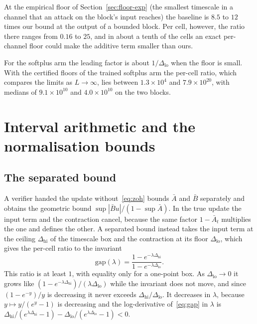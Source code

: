 \documentclass[11pt, a4paper]{article}
\theoremstyle{remark}
\theoremstyle{plain}
\newcommand{\Abar}{\bar{A}}
\newcommand{\Bbar}{\bar{B}}
\begin{document}
At the empirical floor of Section~\ref{sec:floor-exp} (the smallest timescale in a channel that an
attack on the block's input reaches) the baseline is $8.5$ to $12$ times our bound at the output of
a bounded block. Per cell, however, the ratio there ranges from $0.16$ to $25$, and in about a
tenth of the cells an exact per-channel floor could make the additive term smaller than ours.

For the softplus arm the leading factor is about $1/\Delta_{\mathrm{lo}}$ when the floor is small.
With the certified floors of the trained softplus arm the per-cell ratio, which compares the limits
as $L \to \infty$, lies between $1.3 \times 10^{4}$ and $7.9 \times 10^{20}$, with medians of $9.1
\times 10^{10}$ and $4.0 \times 10^{10}$ on the two blocks.

\section{Interval arithmetic and the normalisation bounds}
\label{app:separate}

\subsection{The separated bound}

A verifier handed the update without~\eqref{eq:zoh} bounds $\Abar$ and $\Bbar$ separately and
obtains the geometric bound $\sup|\Bbar u|/(1 - \sup\Abar)$. In the true update the input term
and the contraction cancel, because the same factor $1 - \Abar_t$ multiplies the one and defines
the other. A
separated bound instead takes the input term at the ceiling $\Delta_{\mathrm{hi}}$ of the
timescale box and the contraction at its floor $\Delta_{\mathrm{lo}}$, which gives the per-cell
ratio to the invariant
\begin{equation}
\label{eq:gap}
  \mathrm{gap}(\lambda)
    = \frac{1 - e^{-\lambda \Delta_{\mathrm{hi}}}}{1 - e^{-\lambda \Delta_{\mathrm{lo}}}}.
\end{equation}
This ratio is at least $1$, with equality only for a one-point box. As
$\Delta_{\mathrm{lo}} \to 0$ it grows like $(1 - e^{-\lambda\Delta_{\mathrm{hi}}})/(\lambda\Delta_{\mathrm{lo}})$
while the invariant does not move, and since $(1 - e^{-y})/y$ is decreasing it never exceeds
$\Delta_{\mathrm{hi}}/\Delta_{\mathrm{lo}}$. It decreases in $\lambda$, because $y \mapsto y/(e^{y} - 1)$ is decreasing and the
log-derivative of~\eqref{eq:gap} in $\lambda$ is
$\Delta_{\mathrm{hi}}/(e^{\lambda\Delta_{\mathrm{hi}}} - 1) -
\Delta_{\mathrm{lo}}/(e^{\lambda\Delta_{\mathrm{lo}}} - 1) < 0$.
\end{document}
